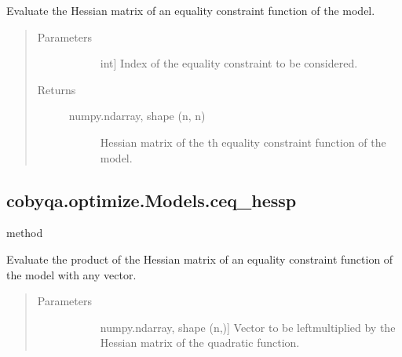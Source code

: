 \documentclass[letterpaper,10pt,english]{sphinxmanual}
\begin{document}
\begin{fulllineitems}
\begin{fulllineitems}
\label{\detokenize{refs/generated/cobyqa.optimize.Models.ceq_hess:cobyqa.optimize.Models.ceq_hess}}
\sphinxAtStartPar
Evaluate the Hessian matrix of an equality constraint function of the
model.
\begin{quote}\begin{description}
\item[{Parameters}] \leavevmode\begin{description}
\item[{}] \leavevmode{[}int{]}
\sphinxAtStartPar
Index of the equality constraint to be considered.

\end{description}

\item[{Returns}] \leavevmode\begin{description}
\item[{numpy.ndarray, shape (n, n)}] \leavevmode
\sphinxAtStartPar
Hessian matrix of the \sphinxhyphen{}th equality constraint function of the
model.

\end{description}

\end{description}\end{quote}

\end{fulllineitems}



\subsection{cobyqa.optimize.Models.ceq\_hessp}
\label{\detokenize{refs/generated/cobyqa.optimize.Models.ceq_hessp:cobyqa-optimize-models-ceq-hessp}}\label{\detokenize{refs/generated/cobyqa.optimize.Models.ceq_hessp::doc}}
\sphinxAtStartPar
method

\begin{fulllineitems}
\label{\detokenize{refs/generated/cobyqa.optimize.Models.ceq_hessp:cobyqa.optimize.Models.ceq_hessp}}
\sphinxAtStartPar
Evaluate the product of the Hessian matrix of an equality constraint
function of the model with any vector.
\begin{quote}\begin{description}
\item[{Parameters}] \leavevmode\begin{description}
\item[{}] \leavevmode{[}numpy.ndarray, shape (n,){]}
\sphinxAtStartPar
Vector to be left\sphinxhyphen{}multiplied by the Hessian matrix of the quadratic
function.


\end{description}
\end{description}
\end{quote}
\end{fulllineitems}
\end{fulllineitems}
\end{document}
